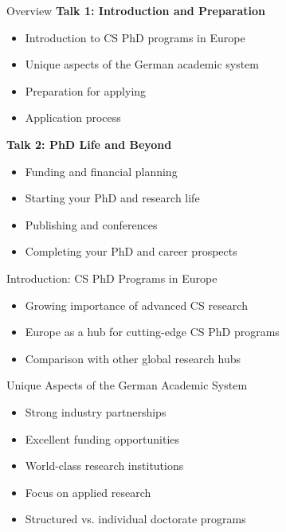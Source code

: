 \documentclass[aspectratio=169,10pt]{beamer}
\begin{document}
\begin{frame}{Overview}
    \textbf{Talk 1: Introduction and Preparation}
    \begin{itemize}
        \item Introduction to CS PhD programs in Europe
        \item Unique aspects of the German academic system
        \item Preparation for applying
        \item Application process
    \end{itemize}
    
    \textbf{Talk 2: PhD Life and Beyond}
    \begin{itemize}
        \item Funding and financial planning
        \item Starting your PhD and research life
        \item Publishing and conferences
        \item Completing your PhD and career prospects
    \end{itemize}
\end{frame}

\begin{frame}{Introduction: CS PhD Programs in Europe}
    \begin{itemize}
        \item Growing importance of advanced CS research
        \item Europe as a hub for cutting-edge CS PhD programs
        \item Comparison with other global research hubs
    \end{itemize}
    
\end{frame}

\begin{frame}{Unique Aspects of the German Academic System}
    \begin{itemize}
        \item Strong industry partnerships
        \item Excellent funding opportunities
        \item World-class research institutions
        \item Focus on applied research
        \item Structured vs. individual doctorate programs
    \end{itemize}
\end{frame}
\end{document}
